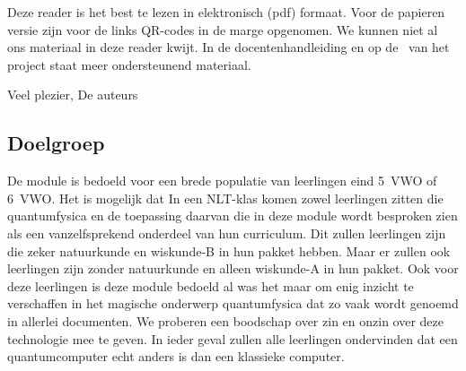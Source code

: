 \documentclass[../../main.tex]{subfiles}
\begin{document}
\fi
{}

Deze reader is het best te lezen in elektronisch (pdf) formaat. Voor de papieren versie zijn voor de links QR-codes in de marge opgenomen. We kunnen niet al ons materiaal in deze reader kwijt. In de docentenhandleiding en op de~ van het project staat meer ondersteunend materiaal.

Veel plezier, De auteurs
\newpage

\subsection*{Doelgroep} De module is bedoeld voor een brede populatie van leerlingen eind 5~VWO of 6~VWO.
Het is mogelijk dat In een NLT-klas komen zowel leerlingen zitten die quantumfysica en de toepassing daarvan die in deze module wordt besproken zien als een vanzelfsprekend onderdeel van hun curriculum. Dit zullen leerlingen zijn die zeker natuurkunde en wiskunde-B in hun pakket hebben. Maar er zullen ook leerlingen zijn zonder natuurkunde en alleen wiskunde-A in hun pakket.  
Ook voor deze leerlingen is deze module bedoeld al was het maar om enig inzicht te verschaffen in het magische onderwerp quantumfysica dat zo vaak wordt genoemd in allerlei documenten. We proberen een boodschap over zin en onzin over deze technologie mee te geven. In ieder geval zullen alle leerlingen ondervinden dat een quantumcomputer echt anders is dan een klassieke computer.
\end{document}
